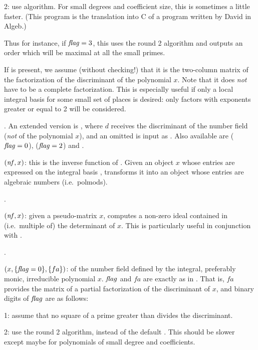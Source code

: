 2: use  algorithm. For small degrees and coefficient size, this
is sometimes a little faster. (This program is the translation into C of a
program written by David  in Algeb.)

Thus for instance, if $\hbox{\it f\kern0pt lag\/}=3$, this uses the round 2 algorithm and outputs
an order which will be maximal at all the small primes.

If  is present, we assume (without checking!) that it is the two-column
matrix of the factorization of the discriminant of the polynomial $x$. Note
that it does \emph{not} have to be a complete factorization. This is
especially useful if only a local integral basis for some small set of places
is desired: only factors with exponents greater or equal to 2 will be
considered.

. An extended version is
, where $d$ receives the discriminant of the
number field (\emph{not} of the polynomial $x$), and an omitted  is input
as . Also available are  ($\hbox{\it f\kern0pt lag\/}=0$),
 ($\hbox{\it f\kern0pt lag\/}=2$) and .

$(\hbox{\it nf\/},x)$: this is the inverse function of
. Given an object $x$ whose entries are expressed on the
integral basis , transforms it into an object whose entries
are algebraic numbers (i.e.~polmods).

.

$(\hbox{\it nf\/},x)$: given a pseudo-matrix $x$, computes a
non-zero ideal contained in (i.e.~multiple of) the determinant of $x$. This
is particularly useful in conjunction with .

.

$(x,\{\hbox{\it f\kern0pt lag\/}=0\},\{fa\})$:  of the
number field defined by the integral, preferably monic, irreducible
polynomial $x$. $\hbox{\it f\kern0pt lag\/}$ and $fa$ are exactly as in . That is, $fa$
provides the matrix of a partial factorization of the discriminant of $x$,
and binary digits of $\hbox{\it f\kern0pt lag\/}$ are as follows:

1: assume that no square of a prime greater than 
divides the discriminant.

2: use the round 2 algorithm, instead of the default . This
should be slower except maybe for polynomials of small degree and
coefficients.

